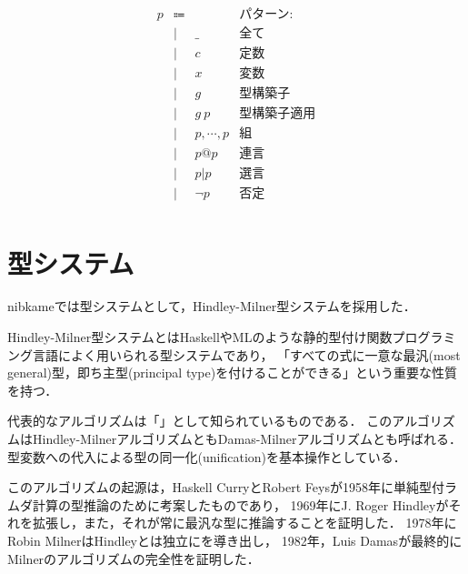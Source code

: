 \documentclass[a4paper,titlepage,report]{jsbook}
\begin{document}
\begin{equation}
\begin{array}{rcll}
p&\Coloneqq&                             & \text{パターン:} \\
 &\mid&  \_                         & \text{全て} \\
 &\mid&  c                          & \text{定数} \\
 &\mid&  x                          & \text{変数} \\
 &\mid&  g                          & \text{型構築子} \\
 &\mid&  g\ p                       & \text{型構築子適用} \\
 &\mid&  p,\cdots,p                 & \text{組} \\
 &\mid&  p @ p                      & \text{連言} \\
 &\mid&  p | p                      & \text{選言} \\
 &\mid&  \lnot p                    & \text{否定} \\
\end{array}
\end{equation}

\section{型システム}\label{sc:型システム}
nibkameでは型システムとして，Hindley-Milner型システムを採用した．

Hindley-Milner型システムとはHaskellやMLのような静的型付け関数プログラミング言語によく用いられる型システムであり，
「すべての式に一意な最汎(most general)型，即ち主型(principal type)を付けることができる」という重要な性質を持つ．

代表的なアルゴリズムは「\algorithmW」\cite{Milner1978348}\cite{Damas:1982:PTF:582153.582176}として知られているものである．
このアルゴリズムはHindley-MilnerアルゴリズムともDamas-Milnerアルゴリズムとも呼ばれる．
型変数への代入による型の同一化(unification)を基本操作としている．

このアルゴリズムの起源は，Haskell CurryとRobert Feysが1958年に単純型付ラムダ計算の型推論のために考案したものであり，
1969年にJ. Roger Hindleyがそれを拡張し，また，それが常に最汎な型に推論することを証明した．
1978年にRobin MilnerはHindleyとは独立に\algorithmW\cite{Milner1978348}を導き出し，
1982年，Luis Damasが最終的にMilnerのアルゴリズムの完全性を証明した\cite{Damas:1982:PTF:582153.582176}．
\end{document}

